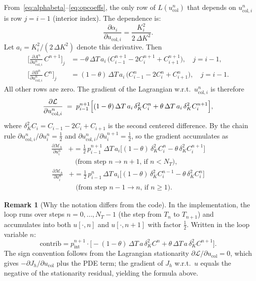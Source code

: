 \documentclass[11pt, a4paper]{article}
\newcommand{\dK}{\Delta K}
\newcommand{\dT}{\Delta T}
\newcommand{\pder}[2]{\frac{\partial #1}{\partial #2}}
\theoremstyle{definition}
\newtheorem{remark}{Remark}[section]
\theoremstyle{plain}
\begin{document}
From~\eqref{eq:alphabeta}--\eqref{eq:opcoeffs}, the only row of $L(u_\text{col}^n)$
that depends on $u_{\text{col},i}^n$ is row $j = i-1$ (interior index).
The dependence is:
\[
  \pder{\alpha_i}{u_{\text{col},i}} = \frac{K_i^2}{2\,\dK^2}.
\]
Let $a_i = K_i^2 / (2\,\dK^2)$ denote this derivative. Then
\begin{align}
  \bigl[\pder{A^n}{u_{\text{col},i}^n}\,C^{n+1}\bigr]_{j}
  &= -\theta\,\dT\,a_i\,\bigl(C_{i-1}^{n+1} - 2C_i^{n+1} + C_{i+1}^{n+1}\bigr),
  \quad j = i-1,
  \label{eq:dAC}\\
  \bigl[\pder{B^n}{u_{\text{col},i}^n}\,C^n\bigr]_{j}
  &= (1-\theta)\,\dT\,a_i\,\bigl(C_{i-1}^n - 2C_i^n + C_{i+1}^n\bigr),
  \quad j = i-1.
  \label{eq:dBC}
\end{align}
All other rows are zero. The gradient of the Lagrangian w.r.t.\
$u_{\text{col},i}^n$ is therefore
\begin{equation}\label{eq:grad_ucol}
  \pder{\mathcal{L}}{u_{\text{col},i}^n}
  \;=\; p_{i-1}^{n+1}
    \Bigl[
      (1-\theta)\,\dT\,a_i\,\delta^2_K C^n_i
      + \theta\,\dT\,a_i\,\delta^2_K C^{n+1}_i
    \Bigr],
\end{equation}
where $\delta^2_K C_i = C_{i-1} - 2C_i + C_{i+1}$ is the second
centered difference. By the chain rule
$\partial u_{\text{col},i}^n / \partial u_i^n = \tfrac{1}{2}$ and
$\partial u_{\text{col},i}^n / \partial u_i^{n+1} = \tfrac{1}{2}$,
so the gradient accumulates as
\begin{equation}\label{eq:grad_pde}
\begin{split}
  \pder{\mathcal{M}_h}{u_i^n}
  &\mathrel{+}=
  \tfrac{1}{2}\,p_{i-1}^{n+1}\,\dT\,a_i
  \bigl[
    (1-\theta)\,\delta^2_K C_i^n - \theta\,\delta^2_K C_i^{n+1}
  \bigr] \\
  &\quad \text{(from step $n \to n+1$, if $n < N_T$)},
\end{split}
\end{equation}
\begin{equation}\label{eq:grad_pde2}
\begin{split}
  \pder{\mathcal{M}_h}{u_i^n}
  &\mathrel{+}=
  \tfrac{1}{2}\,p_{i-1}^{n}\,\dT\,a_i
  \bigl[
    (1-\theta)\,\delta^2_K C_i^{n-1} - \theta\,\delta^2_K C_i^{n}
  \bigr] \\
  &\quad \text{(from step $n-1 \to n$, if $n \geq 1$)}.
\end{split}
\end{equation}

\begin{remark}[Why the notation differs from the code]
In the implementation, the loop runs over steps $n = 0, \ldots, N_T-1$
(the step from $T_n$ to $T_{n+1}$) and accumulates into both $u[\cdot, n]$
and $u[\cdot, n+1]$ with factor $\tfrac{1}{2}$. Written in the loop variable $n$:
\[
  \text{contrib} = p_\text{int}^{n+1} \cdot
    \bigl[-(1-\theta)\,\dT\,a\,\delta^2_K C^n
          + \theta\,\dT\,a\,\delta^2_K C^{n+1}\bigr].
\]
The sign convention follows from the Lagrangian stationarity
$\partial \mathcal{L}/\partial u_\text{col} = 0$, which gives $-\partial J_h/\partial u_\text{col}$
plus the PDE term; the gradient of $J_h$ w.r.t.\ $u$ equals the negative
of the stationarity residual, yielding the formula above.
\end{remark}
\end{document}
